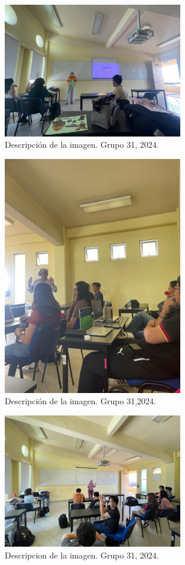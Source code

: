\begin{figure}
    \caption{Descripción de la imagen. Grupo 31, 2024.\label{fig:No.4}}
    \includegraphics[width=0.7\textwidth]{./assets/img/imagen4DH.jpeg}
\end{figure}

\begin{figure}
    \caption{Descripción de la imagen. Grupo 31,2024.\label{fig:No.5}}
    \includegraphics[width=0.7\textwidth]{./assets/img/imagen5DH.jpeg}
\end{figure}

\begin{figure}
    \caption{Descripcion de la imagen. Grupo 31, 2024.\label{fig:No.6}}
    \includegraphics[width=0.7\textwidth]{./assets/img/imagen6DH.jpeg}
\end{figure}
